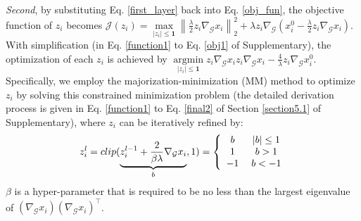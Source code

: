 \documentclass{article}
\begin{document}
\textit{Second}, by substituting Eq. \ref{first_layer} back into Eq. \ref{obj_fun}, the objective function of $z_i$ becomes
$\mathcal{J}(z_i) = \mathop {\max }\limits_{|z_i| \le {\mathbf{1}}} \left\| {\frac{\lambda }{2}{z_i\nabla _\mathcal{G}}x_i} \right\|_2^2 + \lambda z_i{\nabla _\mathcal{G}}({x_i^{0}} - \frac{\lambda }{2}{z_i\nabla _\mathcal{G}}x_i)$.
With simplification (in Eq. \ref{function1} to Eq. \ref{obj1} of Supplementary), the optimization of each $z_i$ is achieved by $\mathop {\arg\min }\limits_{|z_i| \le {\mathbf{1}}} z_i{\nabla _\mathcal{G}}x_i{z_i}{\nabla _\mathcal{G}}x_i - \frac{4}{\lambda }z_i{\nabla _\mathcal{G}}{x_i^{0}}$.
Specifically, we employ the majorization-minimization (MM) method \cite{figueiredo2007majorization} to optimize $z_i$ by solving this constrained minimization problem (the detailed derivation process is given in Eq. \ref{function1} to Eq. \ref{final2} of Section \ref{section5.1} of Supplementary), where $z_i$ can be iteratively refined by:
\begin{equation}
\vspace{-0.3em}
\label{clip}
{z_i^l} = clip(\underbrace{{z_i^{l - 1}} + \frac{2}{{\beta \lambda }}{\nabla _\mathcal{G}}{x_i}}_b,1) = \left\{ {\begin{array}{*{20}{c}}
b\\
1\\
{ - 1}
\end{array}} \right.\begin{array}{*{20}{c}}
{|b| \le 1}\\
{b > 1}\\
{b < -1}
\end{array}
\vspace{-0.1em}
\end{equation}
$\beta$ is a hyper-parameter that is required to be no less than the largest eigenvalue of $(\nabla _\mathcal{G}x_i) (\nabla _\mathcal{G}x_i)^\intercal$.
\end{document}
